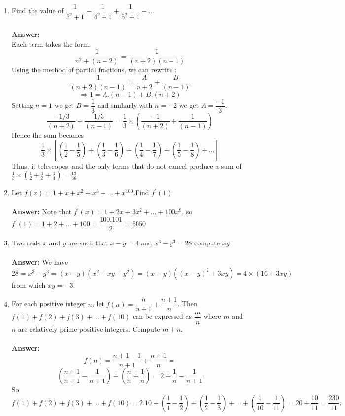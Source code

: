 \documentclass[a4paper]{article}
\begin{document}
\begin{enumerate}
    \item  Find the value of $\dfrac{1}{3^2+1}+
        \dfrac{1}{4^2+1}+\dfrac{1}{5^2+1} + \dots$
        \\ \\
        \textbf{Answer:} \\
        Each term takes the form:
        $$ \dfrac{1}{n^2 + (n-2)} = \dfrac{1}{(n+2)(n-1)}$$
        Using the method of partial fractions, we can rewrite :
        $$ \dfrac{1}{(n+2)(n-1)} = \dfrac{A}{n+2} + \dfrac{B}{(n-1)}$$
        $$ \Rightarrow 1 = A.(n-1) + B.(n+2)$$
        Setting $n=1$ we get $B=\dfrac{1}{3}$ and smiliarly with $n=-2$ we 
        get $A=\dfrac{-1}{3}$. 
        \[
            \dfrac{-1/3}{(n+2)} + \dfrac{1/3}{(n-1)} = \dfrac{1}{3} \times (\dfrac{-1}{(n+2)} + \dfrac{1}{(n-1)})
        \] Hence the sum becomes
        \[
           \displaystyle \frac{1}{3} \times [(\frac{1}{2}-\frac{1}{5}) + (\frac{1}{3}-\frac{1}{6})
           +(\frac{1}{4}-\frac{1}{7}) + (\frac{1}{5} - \frac{1}{8})+  \dots]
        \]
        Thus, it telescopes, and the only terms that do not cancel produce a sum of $\frac{1}{3} \times
        (\frac{1}{2} + \frac{1}{3} + \frac{1}{4}) = \frac{13}{36}$
    \item Let $f(x) = 1 + x + x^2 + x^3 + \dots+ x^{100}$.Find $f^\prime(1)$
        \\ \\
        \textbf{Answer:}
        Note that $f^\prime(x) = 1 + 2x + 3x^2 + \dots + 100x^9
        $, so $f^\prime(1) = 1+2+\dots+100 = \dfrac{100.101}{2} = 5050$
    \item Two reals $x$ and $y$ are such that $x - y = 4$ and $x^3 - y^3 = 28$ compute $xy$ 
        \\ \\
        \textbf{Answer:}
        We have $$28 = x^3 -y^3 = (x-y)(x^2 + xy + y^2) = (x-y)((x-y)^2 + 3xy) = 4 \times(16 + 3xy)$$
        from which $ xy = −3.$
    \item  For each positive integer $n$, let $f(n) = \dfrac{n}{n+1} + \dfrac{n+1}{n}$. Then $f (1) + f (2) + f (3) + 
    \dots + f (10)$ can be expressed as $\dfrac{m}{n}$ where $m$ and $n$ are relatively prime positive integers. Compute $m + n$.
        \\ \\
        \textbf{Answer:}
        \[
            f(n) = \frac{n+1-1}{n+1} + \frac{n+1}{n} = 
        \]
        \[
            (\frac{n+1}{n+1} - \frac{1}{n+1}) + (\frac{n}{n} + \frac{1}{n}) = 2 + \frac{1}{n}
             - \frac{1}{n+1}
        \]
        So 
        \[
            f(1) + f(2) + f(3) + \dots + f(10) = 2.10  + (\frac{1}{1} - \frac{1}{2}) + (\frac{1}{2} - \frac{1}{3}) + \dots
             + (\frac{1}{10} - \frac{1}{11}) = 20 + \frac{10}{11} =  \frac{230}{11}.
        \]
\end{enumerate}
\end{document}
